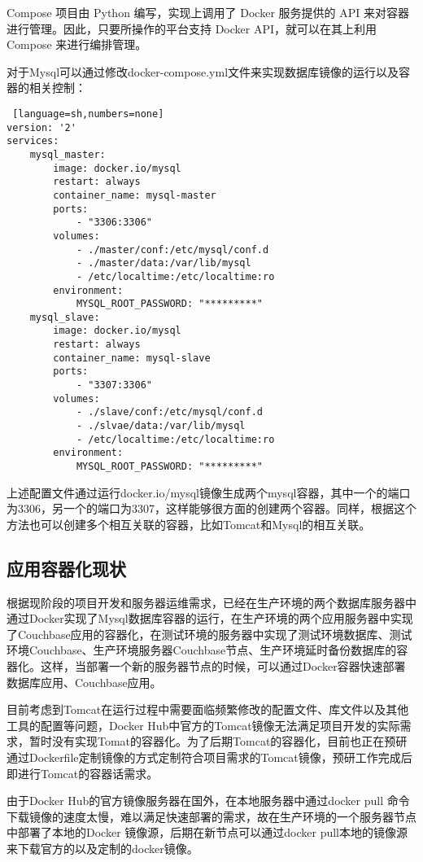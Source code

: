 Compose 项目由 Python 编写，实现上调用了 Docker 服务提供的 API 来对容器进行管理。因此，只要所操作的平台支持 Docker API，就可以在其上利用 Compose 来进行编排管理。

对于Mysql可以通过修改docker-compose.yml文件来实现数据库镜像的运行以及容器的相关控制：
\begin{lstlisting} [language=sh,numbers=none]
version: '2'
services:
    mysql_master:
        image: docker.io/mysql
        restart: always
        container_name: mysql-master
        ports:
            - "3306:3306"
        volumes:
            - ./master/conf:/etc/mysql/conf.d
            - ./master/data:/var/lib/mysql
            - /etc/localtime:/etc/localtime:ro
        environment:
            MYSQL_ROOT_PASSWORD: "*********"
    mysql_slave:
        image: docker.io/mysql
        restart: always
        container_name: mysql-slave
        ports:
            - "3307:3306"
        volumes:
            - ./slave/conf:/etc/mysql/conf.d
            - ./slvae/data:/var/lib/mysql
            - /etc/localtime:/etc/localtime:ro
        environment:
            MYSQL_ROOT_PASSWORD: "*********"
\end{lstlisting}
上述配置文件通过运行docker.io/mysql镜像生成两个mysql容器，其中一个的端口为3306，另一个的端口为3307，这样能够很方面的创建两个容器。同样，根据这个方法也可以创建多个相互关联的容器，比如Tomcat和Mysql的相互关联。
\subsection{应用容器化现状}
根据现阶段的项目开发和服务器运维需求，已经在生产环境的两个数据库服务器中通过Docker实现了Mysql数据库容器的运行，在生产环境的两个应用服务器中实现了Couchbase应用的容器化，在测试环境的服务器中实现了测试环境数据库、测试环境Couchbase、生产环境服务器Couchbase节点、生产环境延时备份数据库的容器化。这样，当部署一个新的服务器节点的时候，可以通过Docker容器快速部署数据库应用、Couchbase应用。

目前考虑到Tomcat在运行过程中需要面临频繁修改的配置文件、库文件以及其他工具的配置等问题，Docker Hub中官方的Tomcat镜像无法满足项目开发的实际需求，暂时没有实现Tomat的容器化。为了后期Tomcat的容器化，目前也正在预研通过Dockerfile定制镜像的方式定制符合项目需求的Tomcat镜像，预研工作完成后即进行Tomcat的容器话需求。

由于Docker Hub的官方镜像服务器在国外，在本地服务器中通过docker pull 命令下载镜像的速度太慢，难以满足快速部署的需求，故在生产环境的一个服务器节点中部署了本地的Docker 镜像源，后期在新节点可以通过docker pull本地的镜像源来下载官方的以及定制的docker镜像。
